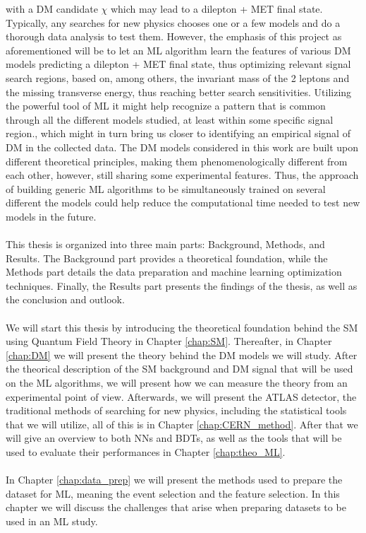 \documentclass[12pt, a4paper]{book}
\begin{document}
with a DM candidate $\chi$ which may lead to a dilepton + MET final state. Typically, any searches for new physics chooses one or a few models and do a thorough data analysis to test them. However, the emphasis of this project as aforementioned will be to let an ML algorithm 
learn the features of various DM models predicting a dilepton + MET final state, thus optimizing relevant signal search regions, based on, among others, the invariant mass of the 2 leptons and the missing transverse energy, thus reaching better search sensitivities. 
Utilizing the powerful tool of ML it might help recognize a pattern that is common through all the different models studied, at least within some specific signal region., which might in turn bring us closer to identifying an empirical signal of DM in the collected data. 
The DM models considered in this work are built upon different theoretical principles, making them phenomenologically different from each other, however, still sharing some experimental features. Thus, the approach of building generic ML algorithms to be simultaneously trained on several different the models 
could help reduce the computational time needed to test new models in the future.\\
\\This thesis is organized into three main parts: Background, Methods, and Results. The Background part provides a theoretical foundation, while the Methods part details the data preparation and machine learning optimization techniques. 
Finally, the Results part presents the findings of the thesis, as well as the conclusion and outlook.\\
\\We will start this thesis by introducing the theoretical foundation behind the SM using Quantum Field Theory in Chapter \ref{chap:SM}. Thereafter, in Chapter \ref{chap:DM} we will present the theory behind the DM models we will study. After the theorical description of the SM background and DM 
signal that will be used on the ML algorithms, we will present how we can measure the theory from an experimental point of view. Afterwards, we will present the ATLAS detector, the traditional methods of searching for new physics, including the statistical 
tools that we will utilize, all of this is in Chapter \ref{chap:CERN_method}. After that we will give an overview to both NNs and BDTs, as well as the tools that will be used to evaluate their performances in Chapter \ref{chap:theo_ML}.\\
\\In Chapter \ref{chap:data_prep} we will present the methods used to prepare the dataset for ML, meaning the event selection and the feature selection. In this chapter we will discuss the challenges that arise when preparing datasets to be used in an ML study. 
\end{document}
